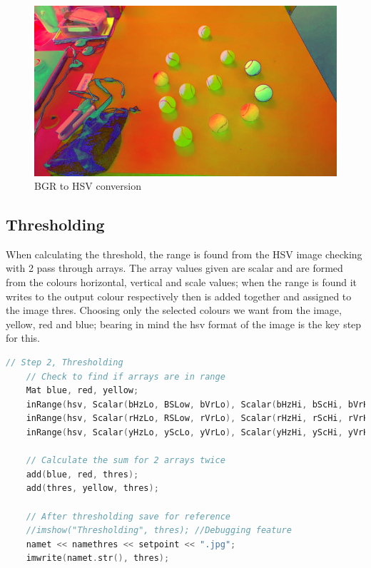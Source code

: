 \documentclass[a4paper, 10pt]{article}
\begin{document}
\begin{figure}[H]
  \includegraphics[width=\linewidth]{images/HSV}
  \caption{BGR to HSV conversion}
  \label{fig:BGR to HSV conversion}
\end{figure}


\subsection{Thresholding}

When calculating the threshold, the range is found from the HSV image checking with 2 pass through arrays. The array values given are scalar and are formed from the colours horizontal, vertical and scale values; when the range is found it writes to the output colour respectively then is added together and assigned to the image thres. Choosing only the selected colours we want from the image, yellow, red and blue; bearing in mind the hsv format of the image is the key step for this.

\begin{lstlisting}[language = C++]
	// Step 2, Thresholding 
	// Check to find if arrays are in range
	Mat blue, red, yellow;
	inRange(hsv, Scalar(bHzLo, BSLow, bVrLo), Scalar(bHzHi, bScHi, bVrHi), blue);
	inRange(hsv, Scalar(rHzLo, RSLow, rVrLo), Scalar(rHzHi, rScHi, rVrHi), red);
	inRange(hsv, Scalar(yHzLo, yScLo, yVrLo), Scalar(yHzHi, yScHi, yVrHi), yellow);
	
	// Calculate the sum for 2 arrays twice 
	add(blue, red, thres);
	add(thres, yellow, thres);

	// After thresholding save for reference
	//imshow("Thresholding", thres); //Debugging feature
	namet << namethres << setpoint << ".jpg";
	imwrite(namet.str(), thres);
\end{lstlisting}
\end{document}
